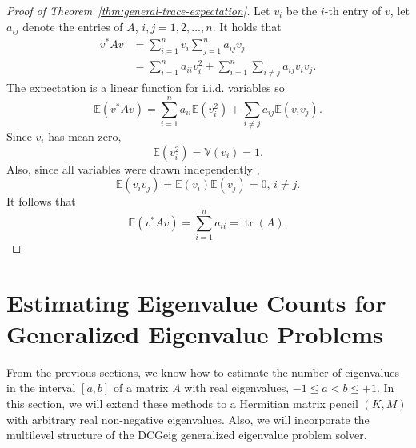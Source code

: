 \documentclass[%
	paper=a4,
	fontsize=10pt,
	DIV11,BCOR10mm,
	numbers=noenddot,
	abstract=yes
]{scrartcl}
\theoremstyle{definition}
\begin{document}
\begin{proof}[Proof of Theorem~\ref{thm:general-trace-expectation}]
	Let $v_i$ be the $i$-th entry of $v$, let $a_{ij}$ denote the entries of
	$A$, $i, j = 1, 2, \dotsc, n$. It holds that
	\begin{align*}
		v^* A v
		&= \sum_{i=1}^n v_i \sum_{j=1}^n a_{ij} v_j \\
		&= \sum_{i=1}^n a_{ii} v_i^2
		+ \sum_{i=1}^n \sum_{i \neq j} a_{ij} v_i v_j.
	\end{align*}
	The expectation is a linear function for i.i.d. variables
	\cite[§24.9]{Kreyszig2011} so
	\[
		\mathbb{E}(v^* A v) =
			\sum_{i=1}^n a_{ii} \mathbb{E}(v_i^2) +
			\sum_{i \neq j} a_{ij} \mathbb{E}(v_i v_j).
	\]
	Since $v_i$ has mean zero,
	\[ \mathbb{E}(v_i^2) = \mathbb{V}(v_i) = 1. \]
	Also, since all variables were drawn independently
	\cite[§24.9]{Kreyszig2011},
	\[ \mathbb{E}(v_i v_j) = \mathbb{E}(v_i) \mathbb{E}(v_j) = 0, \, i \neq j.\]
	It follows that
	\[ \mathbb{E}(v^* A v) = \sum_{i=1}^n a_{ii} = \operatorname{tr}(A). \]
\end{proof}



\section{Estimating Eigenvalue Counts for Generalized Eigenvalue Problems}

From the previous sections, we know how to estimate the number of eigenvalues in
the interval $[a, b]$ of a matrix $A$ with real eigenvalues, $-1 \leq a < b \leq
+1$. In this section, we will extend these methods to a Hermitian matrix pencil
$(K, M)$ with arbitrary real non-negative eigenvalues. Also, we will incorporate
the multilevel structure of the DCGeig generalized eigenvalue problem solver.
\end{document}
